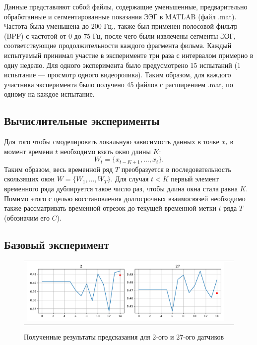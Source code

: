 \documentclass{article}
\begin{document}
Данные представляют собой файлы, содержащие уменьшенные, предварительно обработанные и сегментированные показания ЭЭГ в MATLAB (файл .mat). Частота была уменьшена до 200 Гц., также был применен полосовой фильтр (BPF) с частотой от 0 до 75 Гц, после чего были извлечены сегменты ЭЭГ, соответствующие продолжительности каждого фрагмента фильма. 
Каждый испытуемый принимал участие в эксперименте три раза с интервалом примерно в одну неделю. Для одного эксперимента было предусмотрено 15 испытаний (1 испытание — просмотр одного видеоролика). Таким образом, для каждого участника эксперимента было получено 45 файлов с расширением .mat, по одному на каждое испытание. 

\subsection{Вычислительные эксперименты}

Для того чтобы смоделировать локальную зависимость данных в точке $x_t$ в момент времени $t$ необходимо взять окно длины $K$: 
$$
W_t = \{x_{t - K + 1}, \dots, x_t\}.
$$
Таким образом, весь временной ряд $\textit{T}$ преобразуется в последовательность скользящих окон $\textit{W} = \{W_1, \dots, W_T\}$. Для случая $t < K$ первый элемент временного ряда дублируется такое число раз, чтобы длина окна стала равна $K$. Помимо этого с целью восстановления долгосрочных взаимосвязей необходимо также рассматривать временной отрезок до текущей временной метки $t$ ряда $\textit{T}$ (обозначим его $C$).
\subsection{Базовый эксперимент}
\begin{figure}[h]
\begin{tabular}{cc}
  \includegraphics[width=160mm]{5.pdf} 
\end{tabular}
\caption{Полученные результаты предсказания для 2-ого и 27-ого датчиков}
\label{fig:base}
\end{figure}
\end{document}
